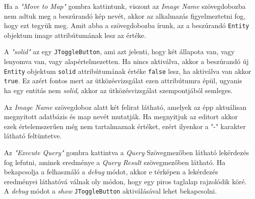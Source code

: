 Ha a \textit{"Move to Map"} gombra kattintunk, viszont az \textit{Image Name} szövegdobozba nem adtuk meg a beszúrandó kép nevét, akkor az alkalmazás figyelmeztetni fog, hogy ezt tegyük meg. Amit abba a szövegdobozba írunk, az a beszúrandó \texttt{Entity} objektum image attribútumának lesz az értéke. 

A \textit{"solid"} az egy \texttt{JToggleButton}, ami azt jelenti, hogy két állapota van, vagy lenyomva van, vagy alapértelmezetten. Ha nincs aktiválva, akkor a beszúrandó új \texttt{Entity} objektum \texttt{solid} attribútumának értéke \texttt{false} lesz, ha aktiválva van akkor \texttt{true}. Ez azért fontos mert az ütközésvizsgálat ezen attribútumra épül, ugyanis ha egy entitás nem \textit{solid}, akkor az ütközésvizsgálat szempontjából semleges.

Az \textit{Image Name} szövegdoboz alatt két felirat látható, amelyek az épp aktuálisan megnyitott adatbázis és map nevét mutatják. Ha megnyitjuk az editort akkor ezek értelemszerűen még nem tartalmaznak értéket, ezért ilyenkor a "-" karakter látható feltüntetve.

Az \textit{"Execute Query"} gombra kattintva a \textit{Query} Szövegmezőben látható lekérdezés fog lefutni, aminek eredménye a \textit{Query Result} szövegmezőben látható. Ha bekapcsolja a felhasználó a \textit{debug} módot, akkor e térképen a lekérdezés eredményei láthatóvá válnak oly módon, hogy egy piros taglalap rajzolódik köré. A \textit{debug} módot a \textit{show} \texttt{JToggleButton} aktiválásával lehet bekapcsolni. 

